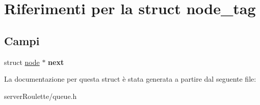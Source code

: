 \hypertarget{structnode__tag}{
\section{Riferimenti per la struct node\_\-tag}
\label{structnode__tag}
}
\subsection*{Campi}
\begin{DoxyCompactItemize}
\item 
\hypertarget{structnode__tag_a4b52e1dbc2c0d0c0d9c5fe3bb255c668}{
struct \hyperlink{structnode__tag}{node} $\ast$ {\bfseries next}}
\label{structnode__tag_a4b52e1dbc2c0d0c0d9c5fe3bb255c668}

\end{DoxyCompactItemize}


La documentazione per questa struct è stata generata a partire dal seguente file:\begin{DoxyCompactItemize}
\item 
serverRoulette/queue.h\end{DoxyCompactItemize}
